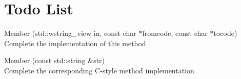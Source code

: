 \chapter{Todo List}
\hypertarget{todo}{}\label{todo}

\begin{DoxyRefList}
\item[Member \doxylink{classUniConv_a86d13dc8f14a1647254c3d8b6e7d76ea}{Uni\+Conv\+::Convert} (std\+::wstring\+\_\+view in, const char \texorpdfstring{$\ast$}{*}fromcode, const char \texorpdfstring{$\ast$}{*}tocode)]\hfill \\
\label{todo__todo000002}%
%
Complete the implementation of this method 
\item[Member \doxylink{classUniConv_a169fcd4de8780282b493baef798ec241}{Uni\+Conv\+::String\+Convert\+To\+Wstring} (const std\+::string \&str)]\hfill \\
\label{todo__todo000001}%
%
Complete the corresponding C-\/style method implementation
\end{DoxyRefList}